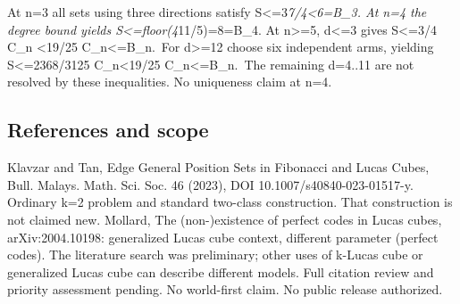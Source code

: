 \documentclass[
  10pt,
]{article}
\begin{document}
At n=3 all sets using three directions satisfy
\textbar S\textbar\textless=3\emph{7/4\textless6=B\_3. At n=4 the degree
bound yields \textbar S\textbar\textless=floor(4}11/5)=8=B\_4. At
n\textgreater=5, d\textless=3 gives \textbar S\textbar\textless=3/4 C\_n
\textless19/25 C\_n\textless=B\_n.~For d\textgreater=12 choose six
independent arms, yielding \textbar S\textbar\textless=2368/3125
C\_n\textless19/25 C\_n\textless=B\_n.~The remaining d=4..11 are not
resolved by these inequalities. No uniqueness claim at n=4.

\subsection{References and scope}\label{references-and-scope}

Klavzar and Tan, Edge General Position Sets in Fibonacci and Lucas
Cubes, Bull. Malays. Math. Sci. Soc. 46 (2023), DOI
10.1007/s40840-023-01517-y. Ordinary k=2 problem and standard two-class
construction. That construction is not claimed new. Mollard, The
(non-)existence of perfect codes in Lucas cubes, arXiv:2004.10198:
generalized Lucas cube context, different parameter (perfect codes). The
literature search was preliminary; other uses of k-Lucas cube or
generalized Lucas cube can describe different models. Full citation
review and priority assessment pending. No world-first claim. No public
release authorized.
\end{document}
